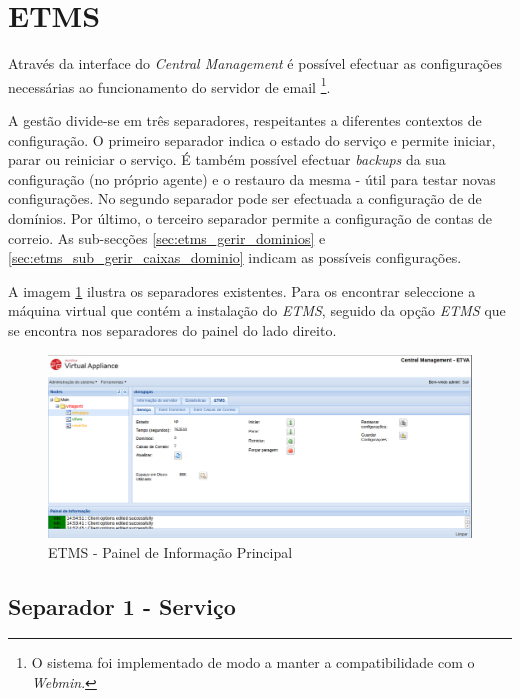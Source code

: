 \section{ETMS}

Através da interface do \textit{Central Management} é possível efectuar as configurações necessárias ao funcionamento do servidor de email \footnote{O sistema foi implementado de modo a manter a compatibilidade com o \textit{Webmin}.}.

A gestão divide-se em três separadores, respeitantes a diferentes contextos de configuração. O primeiro separador indica o estado do serviço e permite iniciar, parar ou reiniciar o serviço. É também possível efectuar \textit{backups} da sua configuração (no próprio agente) e o restauro da mesma - útil para testar novas configurações. No segundo separador pode ser efectuada a configuração de de domínios. Por último, o terceiro separador permite a configuração de contas de correio. As sub-secções \ref{sec:etms_gerir_dominios} e \ref{sec:etms_sub_gerir_caixas_dominio} indicam as possíveis configurações. 

A imagem \ref{fig:etms_main_info} ilustra os separadores existentes. Para os encontrar seleccione a máquina virtual que contém a instalação do \textit{ETMS}, seguido da opção \textit{ETMS} que se encontra nos separadores do painel do lado direito.


\begin{figure}[H]
    \begin{center}
    \includegraphics[scale=0.38]{screenshots/etms/etms_main_info.png}
    \caption{ETMS - Painel de Informação Principal}
    \label{fig:etms_main_info}
    \end{center}
\end{figure}


\subsection{Separador 1 - Serviço}
\label{sec:etms_info_principal}

